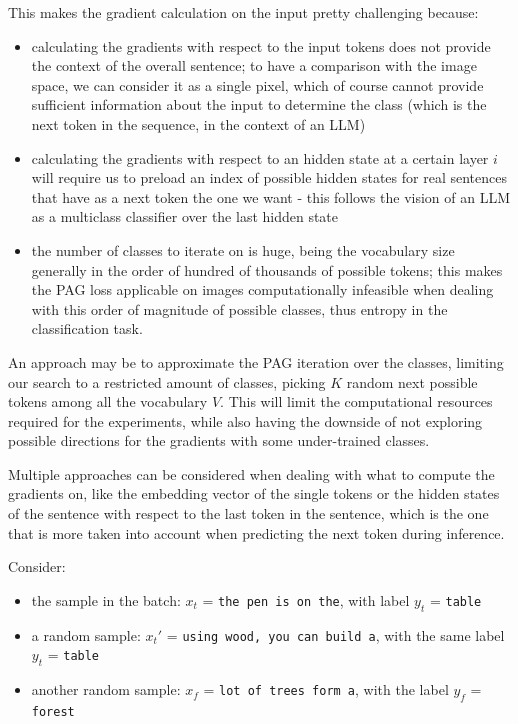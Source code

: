\documentclass[../thesis.tex]{subfiles}
\begin{document}
This makes the gradient calculation on the input pretty challenging because:
\begin{itemize}
    \item calculating the gradients with respect to the input tokens does not provide the context of the overall sentence; to have a comparison with the image space, we can consider it as a single pixel, which of course cannot provide sufficient information about the input to determine the class (which is the next token in the sequence, in the context of an LLM)
    \item calculating the gradients with respect to an hidden state at a certain layer $i$ will require us to preload an index of possible hidden states for real sentences that have as a next token the one we want - this follows the vision of an LLM as a multiclass classifier over the last hidden state
    \item the number of classes to iterate on is huge, being the vocabulary size generally in the order of hundred of thousands of possible tokens; this makes the PAG loss applicable on images computationally infeasible when dealing with this order of magnitude of possible classes, thus entropy in the classification task.
\end{itemize}

An approach may be to approximate the PAG iteration over the classes, limiting our search to a restricted amount of classes, picking $K$ random next possible tokens among all the vocabulary $V$.
This will limit the computational resources required for the experiments, while also having the downside of not exploring possible directions for the gradients with some under-trained classes.

Multiple approaches can be considered when dealing with what to compute the gradients on, like the embedding vector of the single tokens or the hidden states of the sentence with respect to the last token in the sentence, which is the one that is more taken into account when predicting the next token during inference.

Consider:
\begin{itemize}
    \item the sample in the batch: $x_t$ = \texttt{the pen is on the}, with label $y_t$ = \texttt{table}
    \item a random sample: $x_t'$ = \texttt{using wood, you can build a}, with the same label $y_t$ = \texttt{table}
    \item another random sample: $x_f$ = \texttt{lot of trees form a}, with the label $y_f$ = \texttt{forest}
\end{itemize}
\end{document}
